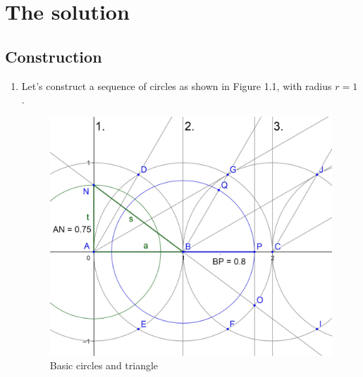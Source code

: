 \documentclass[12pt, letterpaper, oneside]{report}
\begin{document}
\tableofcontents


\chapter{The solution}

\section{Construction}
\begin{enumerate}
	\item Let's construct a sequence of circles as shown in Figure 1.1, with radius $r=1$.
\begin{figure}[H]
	\centerline{\includegraphics[scale=0.2]{images/secnd.jpg}}
	\caption{Basic circles and triangle}
	\label{fig:basic}
\end{figure}
	

\end{enumerate}
\end{document}
